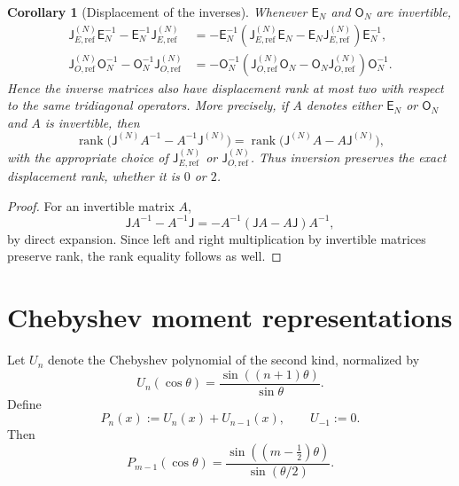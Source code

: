 \documentclass[preprint,12pt]{elsarticle}
\numberwithin{equation}{section}
\theoremstyle{plain}
\newtheorem{corollary}[theorem]{Corollary}
\theoremstyle{definition}
\theoremstyle{remark}
\newcommand{\E}{\mathsf E}
\newcommand{\Omat}{\mathsf O}
\newcommand{\J}{\mathsf J}
\newcommand{\rank}{\operatorname{rank}}
\begin{document}
\begin{corollary}[Displacement of the inverses]
\label{cor:inverse_displacement}
Whenever $\E_N$ and $\Omat_N$ are invertible,
\begin{align}
\J_{E,\mathrm{ref}}^{(N)}\E_N^{-1}-\E_N^{-1}\J_{E,\mathrm{ref}}^{(N)}
&=-\E_N^{-1}
\left(\J_{E,\mathrm{ref}}^{(N)}\E_N-\E_N\J_{E,\mathrm{ref}}^{(N)}\right)
\E_N^{-1},
\label{eq:E_inverse_displacement}\\
\J_{O,\mathrm{ref}}^{(N)}\Omat_N^{-1}-\Omat_N^{-1}\J_{O,\mathrm{ref}}^{(N)}
&=-\Omat_N^{-1}
\left(\J_{O,\mathrm{ref}}^{(N)}\Omat_N-\Omat_N\J_{O,\mathrm{ref}}^{(N)}\right)
\Omat_N^{-1}.
\label{eq:O_inverse_displacement}
\end{align}
Hence the inverse matrices also have displacement rank at most two with respect to the same tridiagonal operators.  More precisely, if $A$ denotes either $\E_N$ or $\Omat_N$ and $A$ is invertible, then
\begin{equation}
\rank\bigl(\J^{(N)}A^{-1}-A^{-1}\J^{(N)}\bigr)
=
\rank\bigl(\J^{(N)}A-A\J^{(N)}\bigr),
\label{eq:inverse_displacement_rank_equality}
\end{equation}
with the appropriate choice of $\J_{E,\mathrm{ref}}^{(N)}$ or $\J_{O,\mathrm{ref}}^{(N)}$.  Thus inversion preserves the exact displacement rank, whether it is $0$ or $2$.
\end{corollary}

\begin{proof}
For an invertible matrix \(A\),
\[
\J A^{-1}-A^{-1}\J=-A^{-1}(\J A-A\J)A^{-1},
\]
by direct expansion.  Since left and right multiplication by invertible
matrices preserve rank, the rank equality follows as well.
\end{proof}

\section{Chebyshev moment representations}
\label{sec:moment_representations}

Let $U_n$ denote the Chebyshev polynomial of the second kind, normalized by
\begin{equation}
U_n(\cos\theta)=\frac{\sin((n+1)\theta)}{\sin\theta}.
\label{eq:U_definition}
\end{equation}
Define
\begin{equation}
P_n(x):=U_n(x)+U_{n-1}(x),
\qquad U_{-1}:=0.
\label{eq:P_definition}
\end{equation}
Then
\begin{equation}
P_{m-1}(\cos\theta)
=\frac{\sin((m-\tfrac12)\theta)}{\sin(\theta/2)}.
\label{eq:P_sine_identity}
\end{equation}
\end{document}
